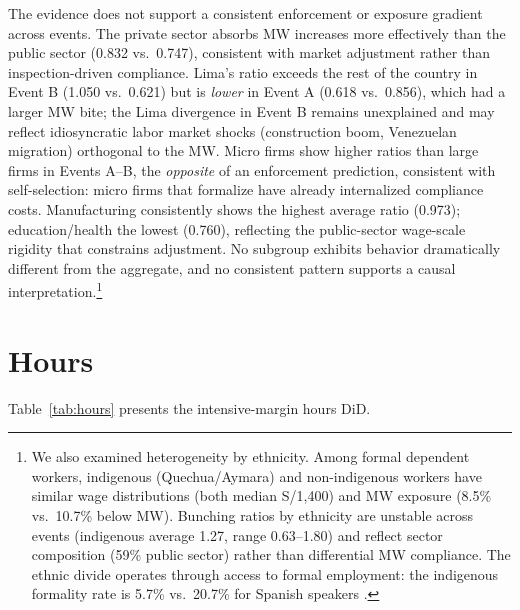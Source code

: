 \documentclass[12pt]{article}
\begin{document}
The evidence does not support a consistent enforcement or exposure gradient across events. The private sector absorbs MW increases more effectively than the public sector (0.832 vs.\ 0.747), consistent with market adjustment rather than inspection-driven compliance. Lima's ratio exceeds the rest of the country in Event B (1.050 vs.\ 0.621) but is \emph{lower} in Event A (0.618 vs.\ 0.856), which had a larger MW bite; the Lima divergence in Event B remains unexplained and may reflect idiosyncratic labor market shocks (construction boom, Venezuelan migration) orthogonal to the MW. Micro firms show higher ratios than large firms in Events A--B, the \emph{opposite} of an enforcement prediction, consistent with self-selection: micro firms that formalize have already internalized compliance costs. Manufacturing consistently shows the highest average ratio (0.973); education/health the lowest (0.760), reflecting the public-sector wage-scale rigidity that constrains adjustment. No subgroup exhibits behavior dramatically different from the aggregate, and no consistent pattern supports a causal interpretation.\footnote{We also examined heterogeneity by ethnicity. Among formal dependent workers, indigenous (Quechua/Aymara) and non-indigenous workers have similar wage distributions (both median S/1,400) and MW exposure (8.5\% vs.\ 10.7\% below MW). Bunching ratios by ethnicity are unstable across events (indigenous average 1.27, range 0.63--1.80) and reflect sector composition (59\% public sector) rather than differential MW compliance. The ethnic divide operates through access to formal employment: the indigenous formality rate is 5.7\% vs.\ 20.7\% for Spanish speakers \citep[see][]{chavez2024ethnic}.}


\section{Hours}\label{sec:hours}

Table~\ref{tab:hours} presents the intensive-margin hours DiD.
\end{document}
